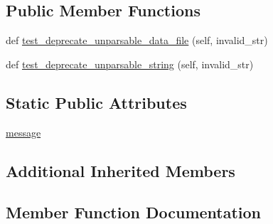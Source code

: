 \subsection*{Public Member Functions}
\begin{DoxyCompactItemize}
\item 
def \hyperlink{classnumpy_1_1core_1_1tests_1_1test__deprecations_1_1TestFromStringAndFileInvalidData_af759abf3902be95583c9d4bf7c7d8ec1}{test\+\_\+deprecate\+\_\+unparsable\+\_\+data\+\_\+file} (self, invalid\+\_\+str)
\item 
def \hyperlink{classnumpy_1_1core_1_1tests_1_1test__deprecations_1_1TestFromStringAndFileInvalidData_a3ee9ec51f5e4bb76f4ead6253a9d804a}{test\+\_\+deprecate\+\_\+unparsable\+\_\+string} (self, invalid\+\_\+str)
\end{DoxyCompactItemize}
\subsection*{Static Public Attributes}
\begin{DoxyCompactItemize}
\item 
\hyperlink{classnumpy_1_1core_1_1tests_1_1test__deprecations_1_1TestFromStringAndFileInvalidData_ad6da5fbafe0e4e11001c3b305d7a4567}{message}
\end{DoxyCompactItemize}
\subsection*{Additional Inherited Members}


\subsection{Member Function Documentation}
\mbox{\label{classnumpy_1_1core_1_1tests_1_1test__deprecations_1_1TestFromStringAndFileInvalidData_af759abf3902be95583c9d4bf7c7d8ec1}} 
